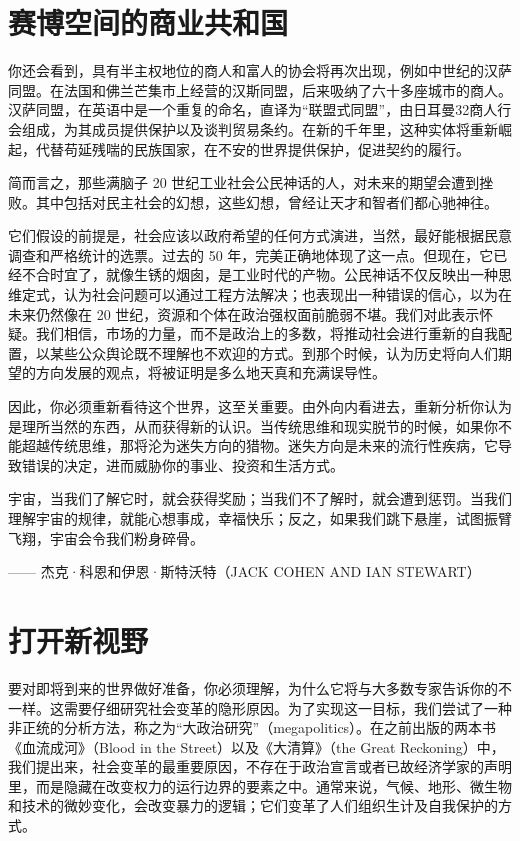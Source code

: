 \section{赛博空间的商业共和国}
你还会看到，具有半主权地位的商人和富人的协会将再次出现，例如中世纪的汉萨同盟。在法国和佛兰芒集市上经营的汉斯同盟，后来吸纳了六十多座城市的商人。汉萨同盟，在英语中是一个重复的命名，直译为“联盟式同盟”，由日耳曼32商人行会组成，为其成员提供保护以及谈判贸易条约。在新的千年里，这种实体将重新崛起，代替苟延残喘的民族国家，在不安的世界提供保护，促进契约的履行。


简而言之，那些满脑子 20 世纪工业社会公民神话的人，对未来的期望会遭到挫败。其中包括对民主社会的幻想，这些幻想，曾经让天才和智者们都心驰神往。


它们假设的前提是，社会应该以政府希望的任何方式演进，当然，最好能根据民意调查和严格统计的选票。过去的 50 年，完美正确地体现了这一点。但现在，它已经不合时宜了，就像生锈的烟囱，是工业时代的产物。公民神话不仅反映出一种思维定式，认为社会问题可以通过工程方法解决；也表现出一种错误的信心，以为在未来仍然像在 20 世纪，资源和个体在政治强权面前脆弱不堪。我们对此表示怀疑。我们相信，市场的力量，而不是政治上的多数，将推动社会进行重新的自我配置，以某些公众舆论既不理解也不欢迎的方式。到那个时候，认为历史将向人们期望的方向发展的观点，将被证明是多么地天真和充满误导性。


因此，你必须重新看待这个世界，这至关重要。由外向内看进去，重新分析你认为是理所当然的东西，从而获得新的认识。当传统思维和现实脱节的时候，如果你不能超越传统思维，那将沦为迷失方向的猎物。迷失方向是未来的流行性疾病，它导致错误的决定，进而威胁你的事业、投资和生活方式。



\begin{tcolorbox}
宇宙，当我们了解它时，就会获得奖励；当我们不了解时，就会遭到惩罚。当我们理解宇宙的规律，就能心想事成，幸福快乐；反之，如果我们跳下悬崖，试图振臂飞翔，宇宙会令我们粉身碎骨。
\begin{flushright}
—— 杰克·科恩和伊恩·斯特沃特（JACK COHEN AND IAN STEWART）
\end{flushright}
\end{tcolorbox}

\section{打开新视野}

要对即将到来的世界做好准备，你必须理解，为什么它将与大多数专家告诉你的不一样。这需要仔细研究社会变革的隐形原因。为了实现这一目标，我们尝试了一种非正统的分析方法，称之为“大政治研究”（megapolitics）。在之前出版的两本书《血流成河》（Blood in the Street）以及《大清算》（the Great Reckoning）中，我们提出来，社会变革的最重要原因，不存在于政治宣言或者已故经济学家的声明里，而是隐藏在改变权力的运行边界的要素之中。通常来说，气候、地形、微生物和技术的微妙变化，会改变暴力的逻辑；它们变革了人们组织生计及自我保护的方式。


